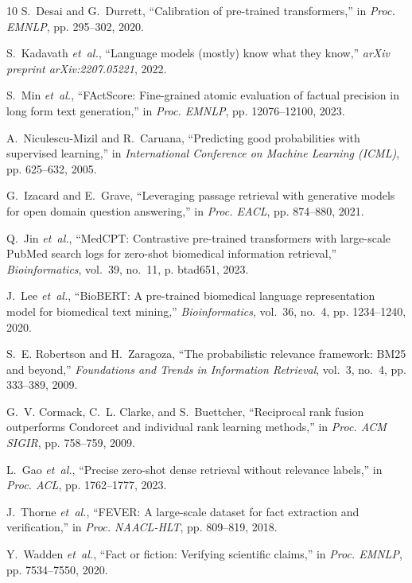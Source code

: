 \documentclass[journal,10pt]{IEEEtran}
\begin{document}
\begin{thebibliography}{10}
S.~Desai and G.~Durrett, ``Calibration of pre-trained transformers,'' in \emph{Proc. EMNLP}, pp. 295--302, 2020.

S.~Kadavath \emph{et~al.}, ``Language models (mostly) know what they know,'' \emph{arXiv preprint arXiv:2207.05221}, 2022.

S.~Min \emph{et~al.}, ``FActScore: Fine-grained atomic evaluation of factual precision in long form text generation,'' in \emph{Proc. EMNLP}, pp. 12076--12100, 2023.

A.~Niculescu-Mizil and R.~Caruana, ``Predicting good probabilities with supervised learning,'' in \emph{International Conference on Machine Learning (ICML)}, pp. 625--632, 2005.

G.~Izacard and E.~Grave, ``Leveraging passage retrieval with generative models for open domain question answering,'' in \emph{Proc. EACL}, pp. 874--880, 2021.

Q.~Jin \emph{et~al.}, ``MedCPT: Contrastive pre-trained transformers with large-scale PubMed search logs for zero-shot biomedical information retrieval,'' \emph{Bioinformatics}, vol.~39, no.~11, p. btad651, 2023.

J.~Lee \emph{et~al.}, ``BioBERT: A pre-trained biomedical language representation model for biomedical text mining,'' \emph{Bioinformatics}, vol.~36, no.~4, pp. 1234--1240, 2020.

S.~E. Robertson and H.~Zaragoza, ``The probabilistic relevance framework: BM25 and beyond,'' \emph{Foundations and Trends in Information Retrieval}, vol.~3, no.~4, pp. 333--389, 2009.

G.~V. Cormack, C.~L. Clarke, and S.~Buettcher, ``Reciprocal rank fusion outperforms Condorcet and individual rank learning methods,'' in \emph{Proc. ACM SIGIR}, pp. 758--759, 2009.

L.~Gao \emph{et~al.}, ``Precise zero-shot dense retrieval without relevance labels,'' in \emph{Proc. ACL}, pp. 1762--1777, 2023.

J.~Thorne \emph{et~al.}, ``FEVER: A large-scale dataset for fact extraction and verification,'' in \emph{Proc. NAACL-HLT}, pp. 809--819, 2018.

Y.~Wadden \emph{et~al.}, ``Fact or fiction: Verifying scientific claims,'' in \emph{Proc. EMNLP}, pp. 7534--7550, 2020.


\end{thebibliography}
\end{document}
